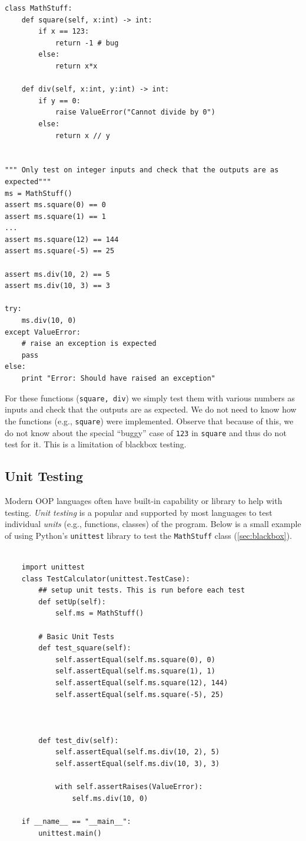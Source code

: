 \documentclass[oneside,11pt,dvipsnames]{book}
\newcommand{\code}[1]{\texttt{#1}}
\begin{document}
\begin{lstlisting}
class MathStuff:
    def square(self, x:int) -> int:
        if x == 123:
            return -1 # bug
        else:
            return x*x
    
    def div(self, x:int, y:int) -> int:
        if y == 0:
            raise ValueError("Cannot divide by 0")
        else:
            return x // y


""" Only test on integer inputs and check that the outputs are as expected"""
ms = MathStuff()
assert ms.square(0) == 0   
assert ms.square(1) == 1
...
assert ms.square(12) == 144
assert ms.square(-5) == 25

assert ms.div(10, 2) == 5
assert ms.div(10, 3) == 3

try:
    ms.div(10, 0)
except ValueError:
    # raise an exception is expected
    pass
else:
    print "Error: Should have raised an exception"

\end{lstlisting}

For these functions (\code{square, div}) we simply test them with various numbers as inputs and check that the outputs are as expected. We do not need to know how the functions (e.g., \code{square}) were implemented. Observe that because of this, we do not know about the special ``buggy'' case of \code{123} in \code{square} and thus do not test for it. This is a limitation of blackbox testing.

\subsection{Unit Testing}\label{sec:unit-testing}

Modern OOP languages often have built-in capability or library to help with testing. \emph{Unit testing} is a popular and supported by most languages to test individual \emph{units} (e.g., functions, classes) of the program. Below is a small example of using Python's \code{unittest} library to test the \code{MathStuff} class (\autoref{sec:blackbox}).

\begin{lstlisting}

    import unittest
    class TestCalculator(unittest.TestCase):
        ## setup unit tests. This is run before each test    
        def setUp(self):
            self.ms = MathStuff()
    
        # Basic Unit Tests
        def test_square(self):
            self.assertEqual(self.ms.square(0), 0)
            self.assertEqual(self.ms.square(1), 1)
            self.assertEqual(self.ms.square(12), 144)
            self.assertEqual(self.ms.square(-5), 25)
    

    
        def test_div(self):
            self.assertEqual(self.ms.div(10, 2), 5)
            self.assertEqual(self.ms.div(10, 3), 3)

            with self.assertRaises(ValueError):
                self.ms.div(10, 0)
    
    if __name__ == "__main__":
        unittest.main()
\end{lstlisting}
\end{document}
